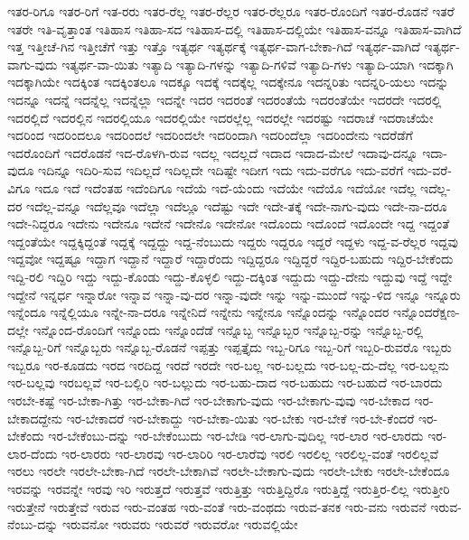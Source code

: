 {ಇತರ-ರಿಗೂ
ಇತರ-ರಿಗೆ
ಇತ-ರರು
ಇತರ-ರೆಲ್ಲ
ಇತರ-ರೆಲ್ಲರ
ಇತರ-ರೆಲ್ಲರೂ
ಇತರ-ರೊಂದಿಗೆ
ಇತರ-ರೊಡನೆ
ಇತರೆ
ಇತರೇ
ಇತಿ-ವೃತ್ತಾಂತ
ಇತಿಹಾಸ
ಇತಿಹಾ-ಸದ
ಇತಿಹಾಸ-ದಲ್ಲಿ
ಇತಿಹಾಸ-ದಲ್ಲಿಯೇ
ಇತಿಹಾಸ-ವನ್ನೂ
ಇತಿಹಾಸ-ವಾಗಿದೆ
ಇತ್ತ
ಇತ್ತೀಚೆ-ಗಿನ
ಇತ್ತೀಚೆಗೆ
ಇತ್ತು
ಇತ್ತೊ
ಇತ್ಯರ್ಥ
ಇತ್ಯರ್ಥಕ್ಕೆ
ಇತ್ಯರ್ಥ-ವಾಗ-ಬೇಕಾ-ಗಿದೆ
ಇತ್ಯರ್ಥ-ವಾಗಿದೆ
ಇತ್ಯರ್ಥ-ವಾಗು-ವುದು
ಇತ್ಯರ್ಥ-ವಾ-ಯಿತು
ಇತ್ಯಾದಿ
ಇತ್ಯಾದಿ-ಗಳನ್ನು
ಇತ್ಯಾದಿ-ಗಳಿವೆ
ಇತ್ಯಾದಿ-ಗಳು
ಇತ್ಯಾದಿ-ಯಾಗಿ
ಇದಕ್ಕಾಗಿ
ಇದಕ್ಕಾಗಿಯೇ
ಇದಕ್ಕಿಂತ
ಇದಕ್ಕಿಂತಲೂ
ಇದಕ್ಕೂ
ಇದಕ್ಕೆ
ಇದಕ್ಕೆಲ್ಲ
ಇದಕ್ಕೇನೂ
ಇದನ್ನರಿತು
ಇದನ್ನರಿ-ಯಲು
ಇದನ್ನು
ಇದನ್ನೂ
ಇದನ್ನೆ
ಇದನ್ನೆಲ್ಲ
ಇದನ್ನೆಲ್ಲಾ
ಇದನ್ನೇ
ಇದರ
ಇದರಂತೆ
ಇದರಂತೆಯೆ
ಇದರಂತೆಯೇ
ಇದರದೇ
ಇದರಲ್ಲಿ
ಇದರಲ್ಲಿದೆ
ಇದರಲ್ಲಿನ
ಇದರಲ್ಲಿಯೂ
ಇದರಲ್ಲಿಯೇ
ಇದರಲ್ಲೆಲ್ಲ
ಇದರಲ್ಲೇ
ಇದರಷ್ಟು
ಇದರಾಚೆ
ಇದರಾಚೆಯೇ
ಇದರಿಂದ
ಇದರಿಂದಲೂ
ಇದರಿಂದಲೆ
ಇದರಿಂದಲೇ
ಇದರಿಂದಾಗಿ
ಇದರಿಂದೆಲ್ಲಾ
ಇದರಿಂದೇನು
ಇದರೆಡೆಗೆ
ಇದರೊಂದಿಗೆ
ಇದರೊಡನೆ
ಇದ-ರೊಳಗಿ-ರುವ
ಇದಲ್ಲ
ಇದಲ್ಲದೆ
ಇದಾದ
ಇದಾದ-ಮೇಲೆ
ಇದಾವು-ದನ್ನೂ
ಇದಾ-ವುದೂ
ಇದಿನ್ನೂ
ಇದಿರಿ-ಸುವ
ಇದಿಲ್ಲದೆ
ಇದಿಲ್ಲದೇ
ಇದಿಷ್ಟೇ
ಇದೀಗ
ಇದು
ಇದು-ವರೆಗೂ
ಇದು-ವರೆಗೆ
ಇದು-ವರೆ-ವಿಗೂ
ಇದೂ
ಇದೆ
ಇದೆಂತಹ
ಇದೆಂದಿಗೂ
ಇದೆಯೆ
ಇದೆ-ಯೆಂದು
ಇದೆಯೇ
ಇದೆಯೊ
ಇದೆಯೋ
ಇದೆಲ್ಲ
ಇದೆಲ್ಲ-ದರ
ಇದೆಲ್ಲ-ವನ್ನೂ
ಇದೆಲ್ಲವೂ
ಇದೆಲ್ಲಾ
ಇದೆಲ್ಲೂ
ಇದೆಷ್ಟು
ಇದೇ
ಇದೇ-ತಕ್ಕೆ
ಇದೇ-ನಾಗು-ವುದು
ಇದೇ-ನಾ-ದರೂ
ಇದೇ-ನಿದ್ದರೂ
ಇದೇನು
ಇದೇನೂ
ಇದೇನೆ
ಇದೇನೊ
ಇದೇನೋ
ಇದೊಂದು
ಇದೊಂದೆ
ಇದೊಂದೇ
ಇದ್ದ
ಇದ್ದಂತೆ
ಇದ್ದಂತೆಯೇ
ಇದ್ದಕ್ಕಿದ್ದಂತೆ
ಇದ್ದಕ್ಕೆ
ಇದ್ದದ್ದು
ಇದ್ದ-ನೆಂಬುದು
ಇದ್ದರು
ಇದ್ದರೂ
ಇದ್ದರೆ
ಇದ್ದಳು
ಇದ್ದ-ವ-ರೆಲ್ಲರ
ಇದ್ದವು
ಇದ್ದವೋ
ಇದ್ದಷ್ಟೂ
ಇದ್ದಾಗ
ಇದ್ದಾನೆ
ಇದ್ದಾರೆ
ಇದ್ದಾರೆಂದು
ಇದ್ದಿದ್ದರೂ
ಇದ್ದಿದ್ದರೆ
ಇದ್ದಿರ-ಬಹುದು
ಇದ್ದಿರ-ಬೇಕೆಂದು
ಇದ್ದಿ-ರಲಿ
ಇದ್ದಿರಿ
ಇದ್ದು
ಇದ್ದು-ಕೊಂಡು
ಇದ್ದು-ಕೊಳ್ಳಲಿ
ಇದ್ದು-ದಕ್ಕಿಂತ
ಇದ್ದುದು
ಇದ್ದು-ದೇನು
ಇದ್ದುವು
ಇದ್ದೆ
ಇದ್ದೇ
ಇದ್ದೇನೆ
ಇನ್ನರ್ಧ
ಇನ್ನಾರೋ
ಇನ್ನಾವ
ಇನ್ನಾ-ವು-ದರ
ಇನ್ನಾ-ವುದೇ
ಇನ್ನು
ಇನ್ನು-ಮುಂದೆ
ಇನ್ನು-ಳಿದ
ಇನ್ನೂ
ಇನ್ನೂರು
ಇನ್ನೆಂದೂ
ಇನ್ನೆಲ್ಲಿಯೂ
ಇನ್ನೇ-ನಾ-ದರೂ
ಇನ್ನೇನಿದೆ
ಇನ್ನೇನು
ಇನ್ನೇನೂ
ಇನ್ನೊಂದನ್ನು
ಇನ್ನೊಂದರ
ಇನ್ನೊಂದರೆಕ್ಷಣ-ದಲ್ಲೇ
ಇನ್ನೊಂದ-ರೊಂದಿಗೆ
ಇನ್ನೊಂದು
ಇನ್ನೊಂದೆಡೆ
ಇನ್ನೊಬ್ಬ
ಇನ್ನೊಬ್ಬರ
ಇನ್ನೊಬ್ಬ-ರನ್ನು
ಇನ್ನೊಬ್ಬ-ರಲ್ಲಿ
ಇನ್ನೊಬ್ಬ-ರಿಗೆ
ಇನ್ನೊಬ್ಬರು
ಇನ್ನೊಬ್ಬ-ರೊಡನೆ
ಇಪ್ಪತ್ತು
ಇಪ್ಪತ್ತೈದು
ಇಬ್ಬ-ರಿಗೂ
ಇಬ್ಬ-ರಿಗೆ
ಇಬ್ಬರಿ-ರುವರೊ
ಇಬ್ಬರು
ಇಬ್ಬರೂ
ಇರ-ಕೂಡದು
ಇರದ
ಇರದಿದ್ದ
ಇರದೆ
ಇರದೇ
ಇರ-ಬಲ್ಲ
ಇರ-ಬಲ್ಲದು
ಇರ-ಬಲ್ಲ-ದು-ದೆಲ್ಲ
ಇರ-ಬಲ್ಲನು
ಇರ-ಬಲ್ಲವು
ಇರಬಲ್ಲವೆ
ಇರ-ಬಲ್ಲಿರಿ
ಇರ-ಬಲ್ಲುದು
ಇರ-ಬಹು-ದಾದ
ಇರ-ಬಹುದು
ಇರ-ಬಹುದೆ
ಇರ-ಬಾರದು
ಇರಬೇ-ಕಷ್ಟೆ
ಇರ-ಬೇಕಾ-ಗಿತ್ತು
ಇರ-ಬೇಕಾ-ಗಿದೆ
ಇರ-ಬೇಕಾಗು-ವುದು
ಇರ-ಬೇಕಾಗು-ವುವು
ಇರ-ಬೇಕಾದ
ಇರ-ಬೇಕಾದದ್ದೇನು
ಇರ-ಬೇಕಾದರೆ
ಇರ-ಬೇಕಾದ್ದು
ಇರ-ಬೇಕಾ-ಯಿತು
ಇರ-ಬೇಕು
ಇರ-ಬೇಕೆ
ಇರ-ಬೇ-ಕೆಂದರೆ
ಇರ-ಬೇಕೆಂದು
ಇರ-ಬೇಕೆಂಬು-ದನ್ನು
ಇರ-ಬೇಕೆಂಬುದು
ಇರ-ಬೇಡಿ
ಇರ-ಲಾಗು-ವುದಿಲ್ಲ
ಇರ-ಲಾರ
ಇರ-ಲಾರದು
ಇರ-ಲಾರ-ದೆಂದು
ಇರ-ಲಾರರು
ಇರ-ಲಾರವು
ಇರ-ಲಾರಿರಿ
ಇರ-ಲಾರೆವು
ಇರಲಿ
ಇರಲಿಲ್ಲ
ಇರಲಿಲ್ಲ-ವಂತೆ
ಇರಲಿಲ್ಲವೆ
ಇರಲು
ಇರಲೇ
ಇರಲೇ-ಬೇಕಾ-ಗಿದೆ
ಇರಲೇ-ಬೇಕಾಗಿವೆ
ಇರಲೇ-ಬೇಕಾಗು-ವುದು
ಇರಲೇ-ಬೇಕು
ಇರಲೇ-ಬೇಕೆಂದೂ
ಇರವನ್ನು
ಇರವನ್ನೇ
ಇರವು
ಇರಿ
ಇರುತ್ತದೆ
ಇರುತ್ತವೆ
ಇರುತ್ತಿತ್ತು
ಇರುತ್ತಿದ್ದಿರೊ
ಇರುತ್ತಿದ್ದೆ
ಇರುತ್ತಿರ-ಲಿಲ್ಲ
ಇರುತ್ತೀರಿ
ಇರುತ್ತೇನೆ
ಇರುತ್ತೇವೆ
ಇರುವ
ಇರು-ವಂತಹ
ಇರು-ವಂತೆ
ಇರು-ವಂಥದು
ಇರುವ-ತನಕ
ಇರು-ವನು
ಇರುವನೆ
ಇರುವ-ನೆಂಬು-ದನ್ನು
ಇರುವನೋ
ಇರುವರು
ಇರುವರೆ
ಇರುವರೋ
ಇರುವಲ್ಲಿಯೇ
}
